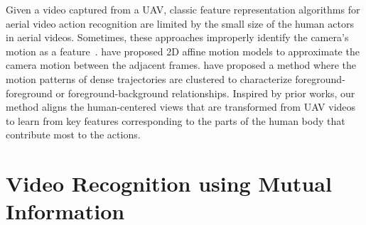 \documentclass[10pt,twocolumn,letterpaper]{article}
\begin{document}
Given a video captured from a UAV,  classic feature representation algorithms for aerial video action recognition are limited by the small size of the human actors in aerial videos. Sometimes, these approaches improperly identify the camera's motion as a feature~\cite{washington2021activity, mi2020moving}.  \cite{jain2013better} have proposed 2D affine motion models to approximate the camera motion between the adjacent frames. \cite{jiang2012trajectory} have proposed a method where the motion patterns of dense trajectories are clustered to characterize foreground-foreground or foreground-background relationships. Inspired by prior works, our method aligns the human-centered views that are transformed from UAV videos to learn from key features corresponding to the parts of the human body that contribute most to the actions.






 \section{Video Recognition using Mutual Information}
\end{document}
